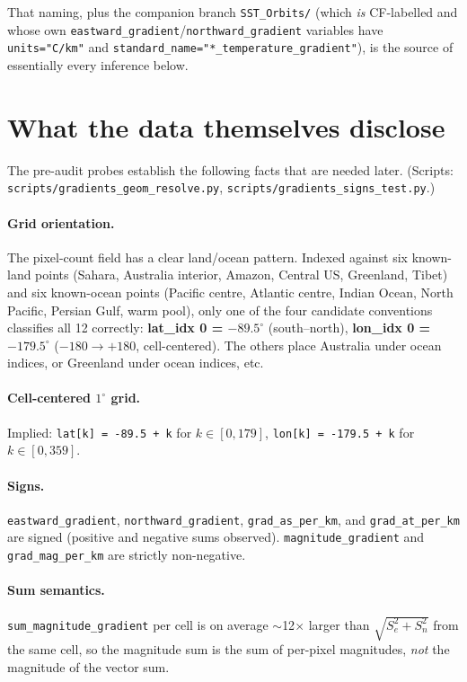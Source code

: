 \documentclass[11pt]{article}
\begin{document}
That naming, plus the companion branch \texttt{SST\_Orbits/} (which
\emph{is} CF-labelled and whose own
\texttt{eastward\_gradient}/\texttt{northward\_gradient} variables
have \texttt{units="C/km"} and
\texttt{standard\_name="*\_temperature\_gradient"}), is the source
of essentially every inference below.

\section{What the data themselves disclose}\label{sec:data}

The pre-audit probes establish the following facts that are needed
later. (Scripts:
\texttt{scripts/gradients\_geom\_resolve.py},
\texttt{scripts/gradients\_signs\_test.py}.)

\paragraph{Grid orientation.} The pixel-count field has a clear
land/ocean pattern. Indexed against six known-land points (Sahara,
Australia interior, Amazon, Central US, Greenland, Tibet) and six
known-ocean points (Pacific centre, Atlantic centre, Indian
Ocean, North Pacific, Persian Gulf, warm pool), only one of the
four candidate conventions classifies all 12 correctly:
\textbf{lat\_idx 0 = $-89.5^\circ$} (south--north), \textbf{lon\_idx
0 = $-179.5^\circ$} ($-180\to+180$, cell-centered). The
others place Australia under ocean indices, or Greenland under
ocean indices, etc.

\paragraph{Cell-centered $1^\circ$ grid.} Implied:
\texttt{lat[k] = -89.5 + k} for $k\in[0,179]$,
\texttt{lon[k] = -179.5 + k} for $k\in[0,359]$.

\paragraph{Signs.} \texttt{eastward\_gradient},
\texttt{northward\_gradient}, \texttt{grad\_as\_per\_km}, and
\texttt{grad\_at\_per\_km} are signed (positive and negative sums
observed). \texttt{magnitude\_gradient} and
\texttt{grad\_mag\_per\_km} are strictly non-negative.

\paragraph{Sum semantics.}
\texttt{sum\_magnitude\_gradient} per cell is on average
$\sim$12$\times$ larger than $\sqrt{S_e^2+S_n^2}$ from the same
cell, so the magnitude sum is the sum of per-pixel magnitudes,
\emph{not} the magnitude of the vector sum.
\end{document}
